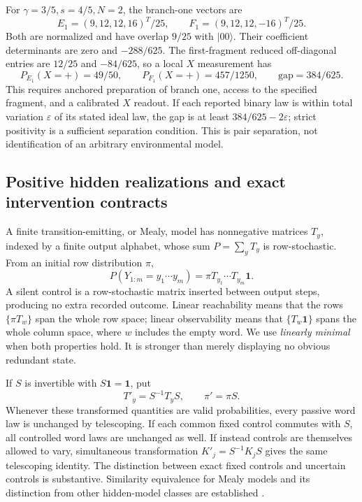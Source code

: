 \begin{example}
\label{op:fragment-readout}
For \(\gamma=3/5,s=4/5,N=2\), the branch-one vectors are
\[
 E_1=(9,12,12,16)^T/25,\qquad
 F_1=(9,12,12,-16)^T/25.
\]
Both are normalized and have overlap \(9/25\) with \(|00\rangle\).
Their coefficient determinants are zero and \(-288/625\).
The first-fragment reduced off-diagonal entries are \(12/25\) and
\(-84/625\), so a local \(X\) measurement has
\[
 P_{E_1}(X=+)=49/50,\qquad P_{F_1}(X=+)=457/1250,
 \qquad \text{gap}=384/625.
\]
This requires anchored preparation of branch one, access to the specified
fragment, and a calibrated \(X\) readout.  If each reported binary law
is within total variation \(\varepsilon\) of its stated ideal law,
the gap is at least \(384/625-2\varepsilon\); strict positivity is a
sufficient separation condition.  This is pair separation, not
identification of an arbitrary environmental model.
\end{example}

\subsection{Positive hidden realizations and exact intervention contracts}
\label{op:controls}

A finite transition-emitting, or Mealy, model has nonnegative matrices
\(T_y\), indexed by a finite output alphabet, whose sum \(P=\sum_y T_y\)
is row-stochastic.  From an initial row distribution \(\pi\),
\[
 P(Y_{1:m}=y_1\cdots y_m)=\pi T_{y_1}\cdots T_{y_m}\mathbf1.
\]
A silent control is a row-stochastic matrix inserted between output
steps, producing no extra recorded outcome.  Linear reachability means
that the rows \(\{\pi T_w\}\) span the whole row space; linear
observability means that \(\{T_w\mathbf1\}\) spans the whole column
space, where \(w\) includes the empty word.  We use \emph{linearly minimal}
when both properties hold.  It is stronger than merely displaying no
obvious redundant state.

If \(S\) is invertible with \(S\mathbf1=\mathbf1\), put
\[
 T'_y=S^{-1}T_yS,\qquad \pi'=\pi S .
\]
Whenever these transformed quantities are valid probabilities, every
passive word law is unchanged by telescoping.  If each common fixed
control commutes with \(S\), all controlled word laws are unchanged as
well.  If instead controls are themselves allowed to vary, simultaneous
transformation \(K'_j=S^{-1}K_jS\) gives the same telescoping identity.
The distinction between exact fixed controls and uncertain controls
is substantive.  Similarity equivalence for Mealy models and its
distinction from other hidden-model classes are established
\cite{op:vanluyten}.

